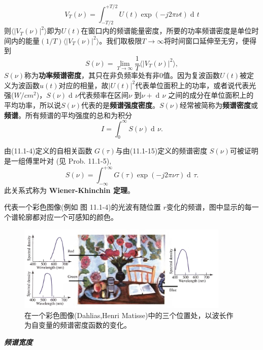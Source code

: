 \documentclass[UTF8]{ctexart}
\numberwithin{figure}{subsection}
\numberwithin{table}{subsection}
\DeclareMathOperator\dif{d\!}
\begin{document}
\begin{equation}
V_T (\nu) = \int_{-T/2}^{+T/2} U(t) \exp(-j2 \pi \nu t) \dif t
\end{equation}
则$ \langle \lvert V_T (\nu) \rvert ^2 \rangle $即为$ U(t) $在窗口内的频谱能量密度，所要的功率频谱密度是单位时间内的能量$ (1/T) \langle \lvert V_T (\nu) \rvert ^2 \rangle $。我们取极限$ T \to \infty $将时间窗口延伸至无穷，便得到
\begin{equation}
S(\nu) = \lim_{T \to \infty} \frac{1}{T} \langle \lvert V_T (\nu) \rvert ^2 \rangle ,
\end{equation}
$S(\nu)$称为\textbf{功率频谱密度}，其只在非负频率处有非0值。因为复波函数$ U(t) $被定义为波函数$u(t)$对应的相量，故$ \lvert U(t) \rvert ^2$代表单位面积上的功率，或者说代表光强($ W/cm^2 $)，$ S(\nu) \dif \nu $代表频率在区间$ \nu $ 到$ \nu +\dif \nu $ 之间的成分在单位面积上的平均功率，所以说$ S(\nu) $代表的是\textbf{频谱强度密度}。$ S(\nu) $经常被简称为\textbf{频谱密度}或\textbf{频谱}。所有频谱的平均强度的总和为积分
\begin{equation}
I = \int_0^\infty S(\nu) \dif \nu .
\end{equation}
\par 由(11.1-4)定义的自相关函数 $ G(\tau) $与由(11.1-15)定义的频谱密度 $ S(\nu) $可被证明是一组傅里叶对 (见 Prob. 11.1-5),
\begin{equation}
S(\nu) = \int_{-\infty}^{+\infty} G(\tau) \exp(-j2 \pi \nu \tau) \dif \tau .
\end{equation}
此关系式称为 \textbf{Wiener-Khinchin 定理}。\\
\par 代表一个彩色图像(例如 图 11.1-4)的光波有随位置 $ r $变化的频谱，图中显示的每一个谱轮廓都对应一个可感知的颜色。
\begin{figure}[ht]
\centering
\includegraphics[width=0.9\textwidth]{11_1_4.PNG}
\caption{ 在一个彩色图像(Dahlias,Henri Matisse)中的三个位置处，以波长作为自变量的频谱密度函数的变化。}
\label{fig: 11_1_4}
\end{figure}
\bigbreak\noindent\textcolor{ksc}{\textbf{\textsl{频谱宽度}}}\\
\end{document}
